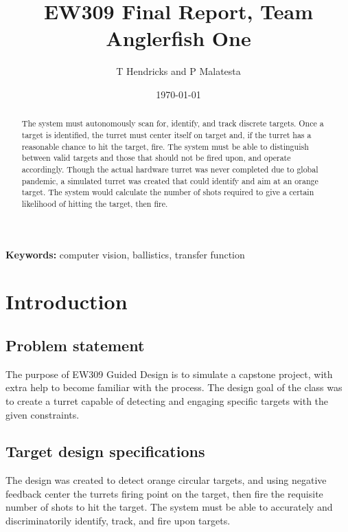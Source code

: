 \documentclass{article}
\title{EW309 Final Report, Team Anglerfish One}
\author{T Hendricks and P Malatesta}
\date{\today}
\begin{document}
\maketitle

\begin{abstract}
The system must autonomously scan for, identify, and track discrete targets. Once a target is identified, the turret must center itself on target and, if the turret has a reasonable chance to hit the target, fire. The system must be able to distinguish between valid targets and those that should not be fired upon, and operate accordingly. Though the actual hardware turret was never completed due to global pandemic, a simulated turret was created that could identify and aim at an orange target. The system would calculate the number of shots required to give a certain likelihood of hitting the target, then fire.
\end{abstract}

{\scriptsize \textbf{Keywords:} computer vision, ballistics, transfer function}

\section{Introduction}
\subsection{Problem statement}
The purpose of EW309 Guided Design is to simulate a capstone project, with extra help to become familiar with the process. The design goal of the class was to create a turret capable of detecting and engaging specific targets with the given constraints. 


\subsection{Target design specifications}
The design was created to detect orange circular targets, and using negative feedback center the turrets firing point on the target, then fire the requisite number of shots to hit the target. The system must be able to accurately and discriminatorily identify, track, and fire upon targets.
\end{document}

